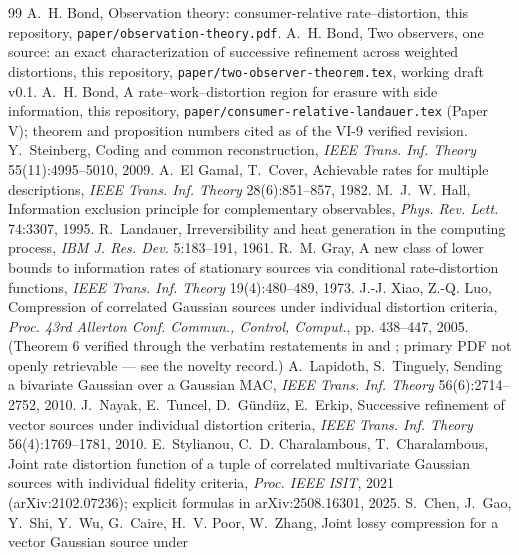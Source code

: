 \documentclass[11pt]{article}
\begin{document}
\begin{thebibliography}{99}
 A.~H. Bond, Observation theory: consumer-relative
rate--distortion, this repository, \texttt{paper/observation-theory.pdf}.
 A.~H. Bond, Two observers, one source: an exact
characterization of successive refinement across weighted distortions, this
repository, \texttt{paper/two-observer-theorem.tex}, working draft v0.1.
 A.~H. Bond, A rate--work--distortion region for
erasure with side information, this repository,
\texttt{paper/consumer-relative-landauer.tex} (Paper V); theorem and
proposition numbers cited as of the VI-9 verified revision.
 Y.~Steinberg, Coding and common reconstruction,
\emph{IEEE Trans. Inf. Theory} 55(11):4995--5010, 2009.
 A.~El Gamal, T.~Cover, Achievable rates for multiple
descriptions, \emph{IEEE Trans. Inf. Theory} 28(6):851--857, 1982.
 M.~J.~W. Hall, Information exclusion principle for
complementary observables, \emph{Phys. Rev. Lett.} 74:3307, 1995.
 R.~Landauer, Irreversibility and heat generation in
the computing process, \emph{IBM J. Res. Dev.} 5:183--191, 1961.
 R.~M. Gray, A new class of lower bounds to information
rates of stationary sources via conditional rate-distortion functions,
\emph{IEEE Trans. Inf. Theory} 19(4):480--489, 1973.
 J.-J. Xiao, Z.-Q. Luo, Compression of correlated
Gaussian sources under individual distortion criteria, \emph{Proc. 43rd
Allerton Conf. Commun., Control, Comput.}, pp. 438--447, 2005. (Theorem 6
verified through the verbatim restatements in \cite{nayak2008} and
\cite{stylianou2021}; primary PDF not openly retrievable --- see the novelty
record.)
 A.~Lapidoth, S.~Tinguely, Sending a bivariate
Gaussian over a Gaussian MAC, \emph{IEEE Trans. Inf. Theory}
56(6):2714--2752, 2010.
 J.~Nayak, E.~Tuncel, D.~G\"und\"uz, E.~Erkip, Successive
refinement of vector sources under individual distortion criteria,
\emph{IEEE Trans. Inf. Theory} 56(4):1769--1781, 2010.
 E.~Stylianou, C.~D. Charalambous, T.~Charalambous,
Joint rate distortion function of a tuple of correlated multivariate
Gaussian sources with individual fidelity criteria, \emph{Proc. IEEE ISIT},
2021 (arXiv:2102.07236); explicit formulas in arXiv:2508.16301, 2025.
 S.~Chen, J.~Gao, Y.~Shi, Y.~Wu, G.~Caire, H.~V. Poor,
W.~Zhang, Joint lossy compression for a vector Gaussian source under

\end{thebibliography}
\end{document}
